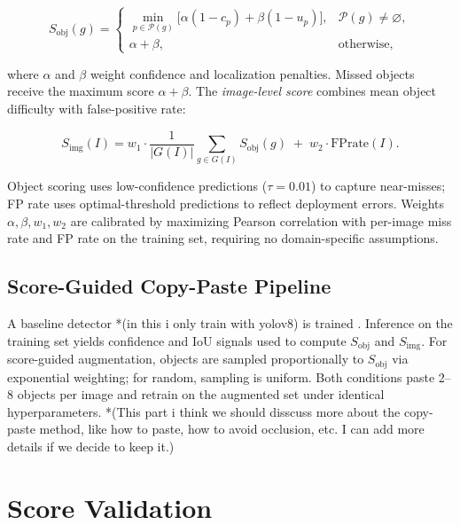 \documentclass[conference]{IEEEtran}
\begin{document}
\begin{equation}
S_{\mathrm{obj}}(g) =
\begin{cases}
  \min_{p \in \mathcal{P}(g)}
    \bigl[\alpha(1{-}c_p) + \beta(1{-}u_p)\bigr],
    & \mathcal{P}(g) \neq \varnothing, \\[3pt]
  \alpha + \beta, & \text{otherwise,}
\end{cases}
\label{eq:obj}
\end{equation}

where $\alpha$ and $\beta$ weight confidence and localization penalties.
Missed objects receive the maximum score $\alpha{+}\beta$. The
\emph{image-level score} combines mean object difficulty with
false-positive rate:

\begin{equation}
S_{\mathrm{img}}(I)
  = w_1 \cdot \frac{1}{|G(I)|}\sum_{g\in G(I)} S_{\mathrm{obj}}(g)
  \;+\; w_2 \cdot \mathrm{FPrate}(I).
\label{eq:img}
\end{equation}

Object scoring uses low-confidence predictions ($\tau{=}0.01$) to
capture near-misses; FP rate uses optimal-threshold predictions
to reflect deployment errors. Weights $\alpha, \beta, w_1, w_2$
are calibrated by maximizing Pearson correlation with per-image
miss rate and FP rate on the training set, requiring no
domain-specific assumptions.

\subsection{Score-Guided Copy-Paste Pipeline}

A baseline detector *(in this i only train with yolov8) 
is trained . Inference on the training set yields confidence and IoU
signals used to compute $S_{\mathrm{obj}}$ and $S_{\mathrm{img}}$.
For score-guided augmentation, objects are sampled proportionally
to $S_{\mathrm{obj}}$ via exponential weighting; for random, sampling
is uniform. Both conditions paste 2--8 objects per image and retrain
on the augmented set under identical hyperparameters.
*(This part i think we should disscuss more about the copy-paste method, like how to paste, 
how to avoid occlusion, etc. I can add more details if we decide to keep it.)

\section{Score Validation}
\label{sec:validation}
\end{document}
